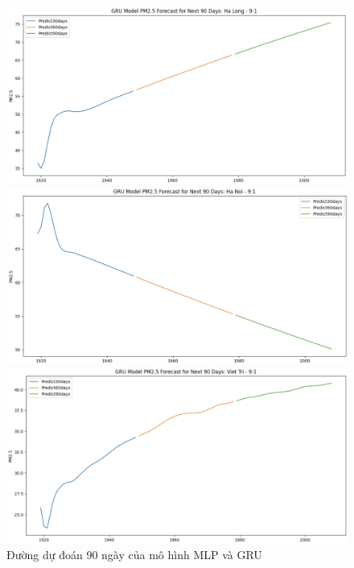 \begin{figure}[H]
        \begin{minipage}{0.15\textwidth}
            \centering
            \includegraphics[width=1\textwidth]{img/final/GRU/90D/GRU_9_1_HL_90D.png}
            \end{minipage}
            \hfill
            \begin{minipage}{0.15\textwidth}
            \centering
            \includegraphics[width=1\textwidth]{img/final/GRU/90D/GRU_9_1_HN_90D.png}
            \end{minipage}
            \hfill
            \begin{minipage}{0.15\textwidth}
            \centering
            \includegraphics[width=1\textwidth]{img/final/GRU/90D/GRU_9_1_VT_90D.png}
            \end{minipage}
            \hfill
    
    \caption{Đường dự đoán 90 ngày của mô hình MLP và GRU}
    \label{fig:LN}
    
\end{figure}
